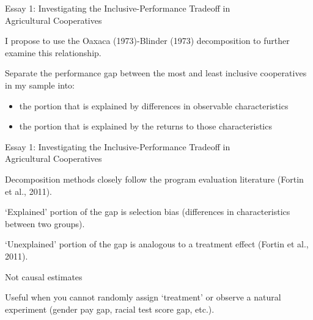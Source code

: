 \documentclass[aspectratio=169]{beamer}
\newenvironment{wideitemize}{\itemize\addtolength{\itemsep}{10pt}}{\enditemize}
\begin{document}
\begin{frame}{Essay 1: Investigating the Inclusive-Performance Tradeoff in \\ \hspace{1.7cm} Agricultural Cooperatives}
    \begin{wideitemize}
        \item I propose to use the Oaxaca (1973)-Blinder (1973) decomposition to further examine this relationship. 
        \item Separate the performance gap between the most and least inclusive cooperatives in my sample into: \vspace{.25cm}
            \begin{itemize}
                \item the portion that is explained by differences in observable characteristics \vspace{.25cm}
                \item the portion that is explained by the returns to those characteristics
            \end{itemize}
    \end{wideitemize}
\end{frame}

\begin{frame}{Essay 1: Investigating the Inclusive-Performance Tradeoff in \\ \hspace{1.7cm} Agricultural Cooperatives}
    \begin{wideitemize}
        \item Decomposition methods closely follow the program evaluation literature (Fortin et al., 2011). 
        \item `Explained' portion of the gap is selection bias (differences in characteristics between two groups).
        \item ‘Unexplained’ portion of the gap is analogous to a treatment effect (Fortin et al., 2011). \vspace{.25cm}
            \begin{wideitemize}
                \item Not causal estimates
            \end{wideitemize}
        \item Useful when you cannot randomly assign `treatment' or observe a natural experiment (gender pay gap, racial test score gap, etc.).     
    \end{wideitemize}
\end{frame}
\end{document}
